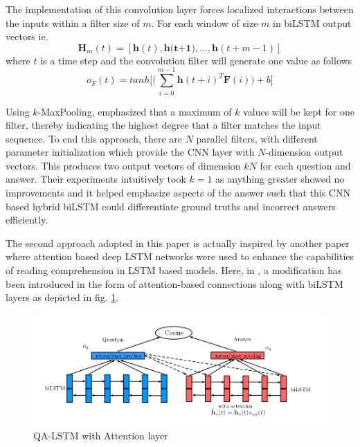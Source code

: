 \documentclass[a4paper,12pt]{report}
\begin{document}
            The implementation of this convolution layer forces localized interactions between the inputs within a filter size of $ m $. For each window of size $ m $ in biLSTM output vectors ie.
            \begin{equation}
            \textbf{H}_{m}(t)=[\textbf{h}(t), \textbf{h(t+1)},...,\textbf{h}(t+m-1)]
            \end{equation}
            where $ t $ is a time step and the convolution filter will generate one value as follows
            \begin{equation}
                o_{F}(t) = tanh \bigg[\bigg(\sum_{i=0}^{m-1}\textbf{h}(t+i)^{T}\textbf{F}(i)\bigg)+b\bigg]
            \end{equation}

            Using $ k $-MaxPooling,\citep{lstmhaighextractive} emphasized that a maximum of $ k $ values will be kept  for one filter, thereby indicating the highest degree that a filter matches the input sequence. To end this approach, there are $ N $ parallel filters, with different parameter initialization which provide the CNN layer with $ N $-dimension output vectors. This produces two output vectors of dimension $ kN $ for each question and answer.  Their experiments intuitively took $k=1$ as anything greater showed no improvements and it helped emphasize aspects of the answer such that this CNN based hybrid biLSTM could differentiate ground truths and incorrect answers efficiently.

            The second approach adopted in this paper is actually inspired by another paper \citep{bilstmHerman} where attention based deep LSTM networks were used to enhance the capabilities of reading comprehension in LSTM based models. Here, in \citep{lstmhaighextractive}, a modification has been introduced in the form of attention-based connections along with biLSTM layers as depicted in fig. \ref{lstmhaigattention}.
            \begin{figure}
                \centering
                \includegraphics[scale=0.35]{../images/lstm-bilstmhaighattention.png}
                \caption{QA-LSTM with Attention layer \citep{lstmhaighextractive}}\label{lstmhaigattention}
            \end{figure}
\end{document}

